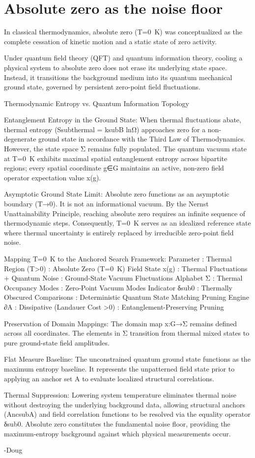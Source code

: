 \chapter{Absolute zero as the noise floor}

In classical thermodynamics, absolute zero (T=0 K) was conceptualized as the complete cessation of kinetic motion and a static state of zero activity.

Under quantum field theory (QFT) and quantum information theory, cooling a physical system to absolute zero does not erase its underlying state space. Instead, it transitions the background medium into its quantum mechanical ground state, governed by persistent zero-point field fluctuations.

Thermodynamic Entropy vs. Quantum Information Topology

Entanglement Entropy in the Ground State: When thermal fluctuations abate, thermal entropy (Ssubthermal = ksubB lnΩ) approaches zero for a non-degenerate ground state in accordance with the Third Law of Thermodynamics. However, the state space Σ remains fully populated. The quantum vacuum state at T=0 K exhibits maximal spatial entanglement entropy across bipartite regions; every spatial coordinate g∈G maintains an active, non-zero field operator expectation value x(g).

Asymptotic Ground State Limit: Absolute zero functions as an asymptotic boundary (T→0). It is not an informational vacuum. By the Nernst Unattainability Principle, reaching absolute zero requires an infinite sequence of thermodynamic steps. Consequently, T=0 K serves as an idealized reference state where thermal uncertainty is entirely replaced by irreducible zero-point field noise.

Mapping T=0 K to the Anchored Search Framework: Parameter : Thermal Region (T>0) : Absolute Zero (T=0 K) Field State x(g) : Thermal Fluctuations + Quantum Noise	: Ground-State Vacuum Fluctuations Alphabet Σ : Thermal Occupancy Modes : Zero-Point Vacuum Modes Indicator δsub0 : Thermally Obscured Comparisons : Deterministic Quantum State Matching Pruning Engine ∂A : Dissipative (Landauer Cost >0) : Entanglement-Preserving Pruning

Preservation of Domain Mappings: The domain map x:G→Σ remains defined across all coordinates. The elements in Σ transition from thermal mixed states to pure ground-state field amplitudes.

Flat Measure Baseline: The unconstrained quantum ground state functions as the maximum entropy baseline. It represents the unpatterned field state prior to applying an anchor set A to evaluate localized structural correlations.

Thermal Suppression: Lowering system temperature eliminates thermal noise without destroying the underlying background data, allowing structural anchors (AncsubA​) and field correlation functions to be resolved via the equality operator δsub0. Absolute zero constitutes the fundamental noise floor, providing the maximum-entropy background against which physical measurements occur.

-Doug

